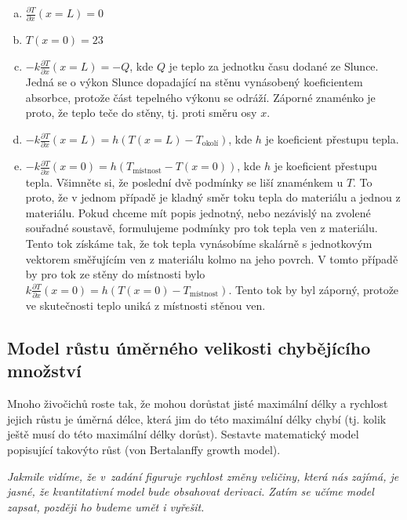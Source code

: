 \begin{enumerate}[a)]
\item $\frac{\partial T}{\partial x}(x=L)=0$
\item $T(x=0)=23$
\item $-k\frac{\partial T}{\partial x}(x=L)=-Q$, kde $Q$ je teplo za jednotku času dodané ze Slunce. Jedná se o výkon Slunce dopadající na stěnu vynásobený koeficientem absorbce, protože část tepelného výkonu se odráží. Záporné znaménko je proto, že teplo teče do stěny, tj. proti směru osy $x$.
\item $-k\frac{\partial T}{\partial x}(x=L)=h(T(x=L)-T_{\text{okolí}})$, kde $h$ je koeficient přestupu tepla.
\item $-k\frac{\partial T}{\partial x}(x=0)=h(T_{\text{místnost}}-T(x=0))$, kde $h$ je koeficient přestupu tepla.
  Všimněte si, že poslední dvě podmínky se liší znaménkem u $T$. To proto, že v jednom případě je kladný směr toku tepla do materiálu a jednou z materiálu. Pokud chceme mít popis jednotný, nebo nezávislý na zvolené souřadné soustavě, formulujeme podmínky pro tok tepla ven z materiálu. Tento tok získáme tak, že tok tepla vynásobíme skalárně s jednotkovým vektorem směřujícím ven z materiálu kolmo na jeho povrch. V tomto případě by pro tok ze stěny do místnosti bylo $k\frac{\partial T}{\partial x}(x=0)=h(T(x=0)-T_{\text{místnost}})$. Tento tok by byl záporný, protože ve skutečnosti teplo uniká z místnosti stěnou ven.
\end{enumerate}
\konec

\subsection{Model růstu úměrného velikosti chybějícího množství}  \label{krava}
Mnoho
živočichů roste tak, že mohou dorůstat jisté maximální délky a
rychlost jejich růstu je úměrná délce, která jim do této maximální
délky chybí (tj. kolik ještě musí do této maximální délky
dorůst). Sestavte matematický model popisující takovýto růst
(von Bertalanffy growth model).


\textit{Jakmile vidíme, že v zadání figuruje rychlost změny veličiny,
  která nás zajímá, je jasné, že kvantitativní model bude obsahovat
  derivaci. Zatím se učíme model zapsat, později ho budeme umět i vyřešit.}


